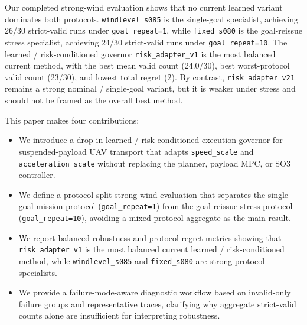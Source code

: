 Our completed strong-wind evaluation shows that no current learned variant
dominates both protocols. \texttt{windlevel\_s085} is the single-goal
specialist, achieving 26/30 strict-valid runs under \texttt{goal\_repeat=1},
while \texttt{fixed\_s080} is the goal-reissue stress specialist, achieving
24/30 strict-valid runs under \texttt{goal\_repeat=10}. The learned /
risk-conditioned governor \texttt{risk\_adapter\_v1} is the most balanced
current method, with the best mean valid count (24.0/30), best worst-protocol
valid count (23/30), and lowest total regret (2). By contrast,
\texttt{risk\_adapter\_v21} remains a strong nominal / single-goal variant, but
it is weaker under stress and should not be framed as the overall best method.

This paper makes four contributions:

\begin{itemize}
  \item We introduce a drop-in learned / risk-conditioned execution governor
  for suspended-payload UAV transport that adapts \texttt{speed\_scale} and
  \texttt{acceleration\_scale} without replacing the planner, payload MPC, or
  SO3 controller.
  \item We define a protocol-split strong-wind evaluation that separates the
  single-goal mission protocol (\texttt{goal\_repeat=1}) from the goal-reissue
  stress protocol (\texttt{goal\_repeat=10}), avoiding a mixed-protocol
  aggregate as the main result.
  \item We report balanced robustness and protocol regret metrics showing that
  \texttt{risk\_adapter\_v1} is the most balanced current learned /
  risk-conditioned method, while \texttt{windlevel\_s085} and
  \texttt{fixed\_s080} are strong protocol specialists.
  \item We provide a failure-mode-aware diagnostic workflow based on
  invalid-only failure groups and representative traces, clarifying why
  aggregate strict-valid counts alone are insufficient for interpreting
  robustness.
\end{itemize}
